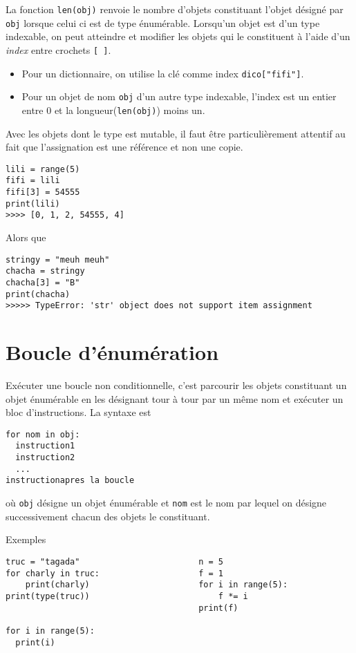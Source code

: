 La fonction \verb|len(obj)| renvoie le nombre d'objets constituant l'objet désigné par \verb|obj| lorsque celui ci est de type énumérable.\newline
Lorsqu'un objet est d'un type indexable, on peut atteindre et modifier les objets qui le constituent à l'aide d'un \emph{index} entre crochets \verb|[ ]|.
\begin{itemize}
 \item Pour un dictionnaire, on utilise la clé comme index \verb|dico["fifi"]|.
 \item Pour un objet de nom \verb|obj| d'un autre type indexable, l'index est un entier entre 0 et la longueur(\verb|len(obj)|) moins un. 
\end{itemize}
Avec les objets dont le type est mutable, il faut être particulièrement attentif au fait que l'assignation est une référence et non une copie.
\begin{verbatim}
lili = range(5)
fifi = lili
fifi[3] = 54555
print(lili)
>>>> [0, 1, 2, 54555, 4]\end{verbatim}
Alors que 
\begin{verbatim}
stringy = "meuh meuh"
chacha = stringy
chacha[3] = "B"
print(chacha)
>>>>> TypeError: 'str' object does not support item assignment\end{verbatim}

\section{Boucle d'énumération}
Exécuter une boucle non conditionnelle, c'est parcourir les objets constituant un objet énumérable en les désignant tour à tour par un même nom et exécuter un bloc d'instructions. 
La syntaxe est
\begin{verbatim}
for nom in obj:
  instruction1
  instruction2
  ...
instructionapres la boucle\end{verbatim}
où \texttt{obj} désigne un objet énumérable et \texttt{nom} est le nom par lequel on désigne successivement chacun des objets le constituant. 

Exemples
\begin{verbatim}
truc = "tagada"                        n = 5                     
for charly in truc:                    f = 1
    print(charly)                      for i in range(5):
print(type(truc))                          f *= i
                                       print(f)
                                       
for i in range(5):
  print(i)
                                       \end{verbatim}

